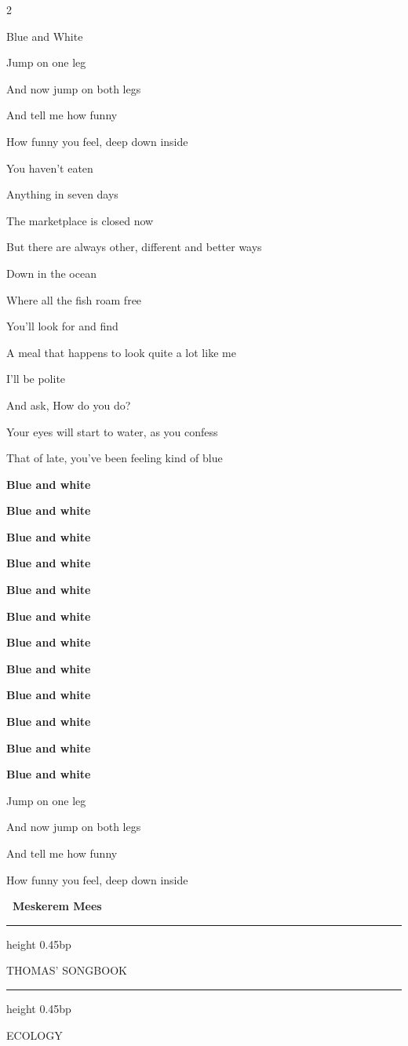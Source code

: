 \documentclass[10pt,twoside]{article}
\newlength{\songcolumnwidth}
\newcommand{\songbooktitle}{Thomas' Songbook}
\newcommand{\categorylabel}[1]{%
  {\categoryface\fontsize{17bp}{19bp}\selectfont\MakeUppercase{#1}}%
}
\newcommand{\category}[1]{%
  \par\noindent
  \parbox[c]{\songcolumnwidth}{%
    \centering
    \hrule height 0.45bp\vskip 2.5bp
    {\mastheadface\fontsize{10bp}{11bp}\selectfont\MakeUppercase{\songbooktitle}\par}%
    \vskip 2bp\hrule height 0.45bp
  }%
  \hfill
  \categorylabel{#1}%
  \par\vspace{11bp}%
}
\newcommand{\songtext}{\raggedright\fontsize{9bp}{9.15bp}\selectfont}
\newenvironment{songcolumns}
  {\begin{multicols*}{2}\songtext}
  {\end{multicols*}}
\newcommand{\songtitle}[1]{%
  \par\addvspace{9bp}%
  {\titleface\fontsize{14.5bp}{15bp}\selectfont #1\par}%
  \nobreak\vskip 2bp%
}
\newcommand{\lyric}[1]{%
  \hangindent=9bp\relax
  #1\par
}
\newenvironment{stanza}{\par\begingroup}{\par\endgroup\addvspace{4bp}}
\newcommand{\refrain}[1]{\lyric{\textbf{#1}}}
\newcommand{\songcredit}[1]{%
  \par\nobreak\noindent\hspace*{9bp}%
  {\sffamily\bfseries\fontsize{7bp}{8bp}\selectfont\textemdash\ #1\par}%
}
\begin{document}
\begin{songcolumns}
\columnbreak

\songtitle{Blue and White}
\begin{stanza}
  \lyric{Jump on one leg}
  \lyric{And now jump on both legs}
  \lyric{And tell me how funny}
  \lyric{How funny you feel, deep down inside}
\end{stanza}
\begin{stanza}
  \lyric{You haven't eaten}
  \lyric{Anything in seven days}
  \lyric{The marketplace is closed now}
  \lyric{But there are always other, different and better ways}
\end{stanza}
\begin{stanza}
  \lyric{Down in the ocean}
  \lyric{Where all the fish roam free}
  \lyric{You'll look for and find}
  \lyric{A meal that happens to look quite a lot like me}
\end{stanza}
\begin{stanza}
  \lyric{I'll be polite}
  \lyric{And ask, \textquotedbl{}How do you do?\textquotedbl{}}
  \lyric{Your eyes will start to water, as you confess}
  \lyric{That of late, you've been feeling kind of blue}
\end{stanza}
\begin{stanza}
  \refrain{Blue and white}
  \refrain{Blue and white}
  \refrain{Blue and white}
  \refrain{Blue and white}
\end{stanza}
\begin{stanza}
  \refrain{Blue and white}
  \refrain{Blue and white}
  \refrain{Blue and white}
  \refrain{Blue and white}
\end{stanza}
\begin{stanza}
  \refrain{Blue and white}
  \refrain{Blue and white}
  \refrain{Blue and white}
  \refrain{Blue and white}
\end{stanza}
\begin{stanza}
  \lyric{Jump on one leg}
  \lyric{And now jump on both legs}
  \lyric{And tell me how funny}
  \lyric{How funny you feel, deep down inside}
\end{stanza}
\songcredit{Meskerem Mees}

\end{songcolumns}

\clearpage

\category{Ecology}
\end{document}
